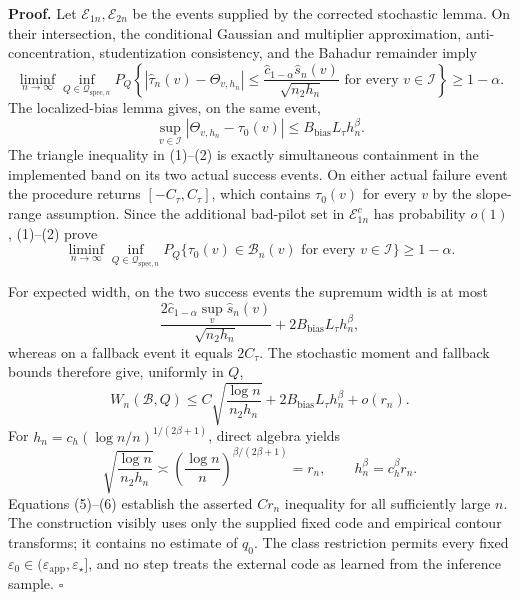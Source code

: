 \textbf{Proof.}
Let \(\mathcal E_{1n},\mathcal E_{2n}\) be the events supplied by the corrected stochastic lemma.  On their intersection, the conditional Gaussian and multiplier approximation, anti-concentration, studentization consistency, and the Bahadur remainder imply
\[
 \liminf_{n\to\infty}\inf_{Q\in\mathcal Q_{\mathrm{spec},n}}
 P_Q\left\{
 |\widehat\tau_n(v)-\Theta_{v,h_n}|
 \le\frac{\widehat c_{1-\alpha}\widehat s_n(v)}{\sqrt{n_2h_n}}
 \text{ for every }v\in\mathcal I\right\}\ge1-\alpha. \tag{1}
\]
The localized-bias lemma gives, on the same event,
\[
 \sup_{v\in\mathcal I}|\Theta_{v,h_n}-\tau_0(v)|
 \le B_{\mathrm{bias}}L_\tau h_n^\beta. \tag{2}
\]
The triangle inequality in (1)--(2) is exactly simultaneous containment in the implemented band on its two actual success events.  On either actual failure event the procedure returns \([-C_\tau,C_\tau]\), which contains \(\tau_0(v)\) for every \(v\) by the slope-range assumption.  Since the additional bad-pilot set in \(\mathcal E_{1n}^c\) has probability \(o(1)\), (1)--(2) prove
\[
 \liminf_{n\to\infty}\inf_{Q\in\mathcal Q_{\mathrm{spec},n}}
 P_Q\{\tau_0(v)\in\mathcal B_n(v)\text{ for every }v\in\mathcal I\}
 \ge1-\alpha. \tag{3}
\]

For expected width, on the two success events the supremum width is at most
\[
 \frac{2\widehat c_{1-\alpha}\sup_v\widehat s_n(v)}{\sqrt{n_2h_n}}
 +2B_{\mathrm{bias}}L_\tau h_n^\beta, \tag{4}
\]
whereas on a fallback event it equals \(2C_\tau\).  The stochastic moment and fallback bounds therefore give, uniformly in \(Q\),
\[
 W_n(\mathcal B,Q)
 \le C\sqrt{\frac{\log n}{n_2h_n}}
 +2B_{\mathrm{bias}}L_\tau h_n^\beta+o(r_n). \tag{5}
\]
For \(h_n=c_h(\log n/n)^{1/(2\beta+1)}\), direct algebra yields
\[
 \sqrt{\frac{\log n}{n_2h_n}}\asymp
 \left(\frac{\log n}{n}\right)^{\beta/(2\beta+1)}=r_n,
 \qquad h_n^\beta=c_h^\beta r_n. \tag{6}
\]
Equations (5)--(6) establish the asserted \(Cr_n\) inequality for all sufficiently large \(n\).  The construction visibly uses only the supplied fixed code and empirical contour transforms; it contains no estimate of \(q_0\).  The class restriction permits every fixed \(\varepsilon_0\in(\varepsilon_{\mathrm{app}},\varepsilon_\star]\), and no step treats the external code as learned from the inference sample. \(\square\)